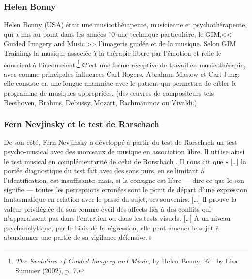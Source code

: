 \subsubsection{Helen Bonny} 


Helen Bonny (USA) était une musicothérapeute,
musicienne et psychothérapeute, qui a mis au point dans les années 70
une technique particulière, le GIM,<<\,Guided Imagery and Music\,>>
l'imagerie guidée et de la musique. Selon GIM
Trainings\autocite{gim_site} la
musique associée à la thérapie libère par l'émotion et relie le
conscient à l'inconscient.\footnote{\textsl{The Evolution of Guided Imagery and Music}, 
	by Helen Bonny, Ed. by Lisa Summer (2002), p. 7.}
 C'est une forme réceptive de travail
en musicothérapie, avec comme principales influences Carl Rogers, Abraham Maslow et Carl Jung; 
elle  consiste en une longue anamnèse avec le
patient qui permettra de cibler le programme de musiques appropriées. 
(des \oe uvres de compositeurs tels Beethoven, Brahms, Debussy,
Mozart, Rachmaninov ou Vivaldi.)






 \subsubsection{Fern Nevjinsky et le test de Rorschach}
 
 De son côté, Fern Nevjinsky a développé à partir du  test de Rorschach un test psycho-musical avec des morceaux
de musique en association libre. Il utilise ainsi le test
musical en complémentarité de celui de Rorschach%
\autocite[Fern Nevjinsky, maître de conférences à l'Université de Rouen, musicien, psycho-analyste. 
Comparaison des modalités de projection et d'expression au test de Rorschach et à un test psycho-musical pour des adolescents de 13 à 16 ans.]{nevjinsky:adolescence}.  
Il nous dit  que  «\,[\ldots] la
portée diagnostique du test fait avec des sons purs, en se limitant à
l'identification, est insuffisante; mais, si la consigne est libre ---
dire ce que le son signifie --- toutes les perceptions erronées sont
le point de départ d'une expression fantasmatique en relation avec le
passé du sujet, ses souvenirs. [\ldots] 
Il prouve  la valeur privilégiée du son comme éveil
des affects liés à des conflits qui n'apparaissent pas dans
l'entretien ou dans les tests visuels.  [\ldots] A un niveau
psychanalytique, par le biais de la régression, elle peut amener le sujet à abandonner une partie de sa vigilance défensive.\,»

